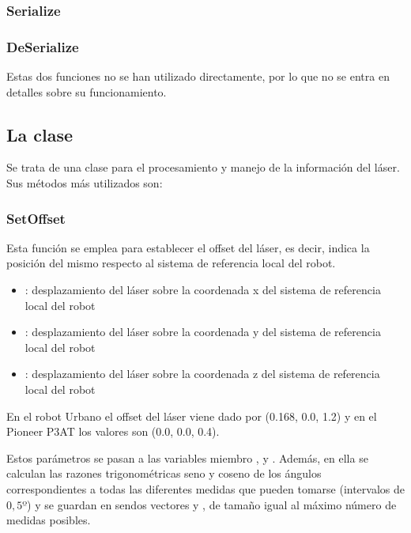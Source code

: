 \subsubsection {Serialize}
\subsubsection {DeSerialize}

\vspace{0.2cm}
\noindent
Estas dos funciones no se han utilizado directamente, por lo que no se entra en detalles sobre su funcionamiento.

\subsection{La clase }
Se trata de una clase para el procesamiento y manejo de la información del láser. Sus métodos más utilizados son:

\subsubsection {SetOffset}


\noindent
Esta función se emplea para establecer el offset del láser, es decir, indica la posición del mismo respecto al sistema de referencia local del robot.

\begin{itemize}
  \item {}: desplazamiento del láser sobre la coordenada x del sistema de referencia local del robot
  \item {}: desplazamiento del láser sobre la coordenada y del sistema de referencia local del robot
  \item {}: desplazamiento del láser sobre la coordenada z del sistema de referencia local del robot
\end{itemize}

\noindent
En el robot Urbano el offset del láser viene dado por (0.168, 0.0, 1.2) y en el Pioneer P3AT los valores son (0.0, 0.0, 0.4).

Estos parámetros se pasan a las variables miembro ,  y . Además, en ella se calculan las razones trigonométricas seno y coseno de los ángulos correspondientes a todas las diferentes medidas que pueden tomarse (intervalos de $0,5º$) y se guardan en sendos vectores  y , de tamaño igual al máximo número de medidas posibles.

